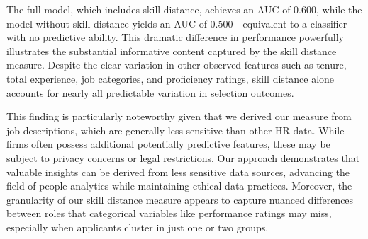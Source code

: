 The full model, which includes skill distance, achieves an AUC of 0.600, while the model without skill distance yields an AUC of 0.500 - equivalent to 
a classifier with no predictive ability. This dramatic difference in performance powerfully illustrates the substantial informative content captured by 
the skill distance measure. Despite the clear variation in other observed features such as tenure, total experience, job categories, and proficiency 
ratings, skill distance alone accounts for nearly all predictable variation in selection outcomes.

This finding is particularly noteworthy given that we derived our measure from job descriptions, which are generally less sensitive than other HR data. 
While firms often possess additional potentially predictive features, these may be subject to privacy concerns or legal restrictions. Our approach demonstrates 
that valuable insights can be derived from less sensitive data sources, advancing the field of people analytics while maintaining ethical data practices. Moreover, 
the granularity of our skill distance measure appears to capture nuanced differences between roles that categorical variables like performance ratings may miss, 
especially when applicants cluster in just one or two groups.